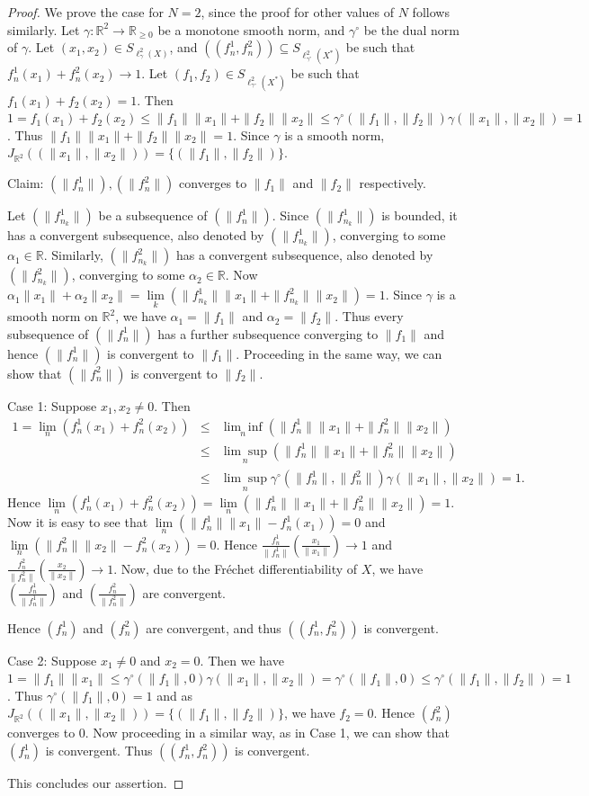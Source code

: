 \documentclass[11pt]{amsart}
\newcommand{\ra}{\rightarrow}
\newcommand{\ci}{\subseteq}
\newcommand{\al}{\alpha}
\newcommand{\ga}{\gamma}
\newcommand{\mb}{\mathbb}
\newcommand{\cc}{\circ}
\newcommand{\beqa}{\begin{eqnarray*}}
\newcommand{\eeqa}{\end{eqnarray*}}
\begin{document}
\begin{proof}
We prove the case for $N=2$, since the proof for other values of $N$ follows similarly. Let $\ga:\mb{R}^2\ra\mb{R}_{\geq0}$ be a monotone smooth norm, and $\ga^\cc$ be the dual norm of $\ga$. Let $(x_1,x_2)\in S_{\ell_\ga^2(X)}$,  and $((f_n^1,f_n^2))\ci S_{\ell_{\ga^\cc}^2(X^*)}$ be such that $f_n^1(x_1)+f_n^2(x_2)\ra 1$. Let $(f_1,f_2)\in S_{\ell_{\ga^\cc}^2(X^*)}$ be such that $f_1(x_1)+f_2(x_2)=1$. Then $1=f_1(x_1)+f_2(x_2)\leq\|f_1\|\|x_1\|+\|f_2\|\|x_2\|\leq\ga^\cc(\|f_1\|,\|f_2\|)\ga(\|x_1\|,\|x_2\|)=1$. Thus $\|f_1\|\|x_1\|+\|f_2\|\|x_2\|=1$. Since $\ga$ is a smooth norm, $J_{\mb{R}^2}((\|x_1\|,\|x_2\|))=\{(\|f_1\|,\|f_2\|)\}$.

{\sc Claim:} $(\|f_n^1\|),(\|f_n^2\|)$ converges to $\|f_1\|$ and $\|f_2\|$ respectively.

Let $(\|f_{n_k}^1\|)$ be a subsequence of $(\|f_n^1\|)$. Since $(\|f_{n_k}^1\|)$ is bounded, it has a convergent subsequence, also denoted by $(\|f_{n_k}^1\|)$, converging to some $\al_1\in\mb{R}$. Similarly, $(\|f_{n_k}^2\|)$ has a convergent subsequence, also denoted by $(\|f_{n_k}^2\|)$, converging to some $\al_2\in\mb{R}$. Now $\al_1\|x_1\|+\al_2\|x_2\|=\underset{k}{\lim}(\|f_{n_k}^1\|\|x_1\|+\|f_{n_k}^2\|\|x_2\|)=1$. Since $\ga$ is a smooth norm on $\mb{R}^2$, we have $\al_1=\|f_1\|$ and $\al_2=\|f_2\|$.  Thus every subsequence of $(\|f_n^1\|)$ has a further subsequence converging to $\|f_1\|$ and hence $(\|f_n^1\|)$ is convergent to $\|f_1\|$. Proceeding in the same way, we can show that $(\|f_n^2\|)$ is convergent to $\|f_2\|$.

{\sc Case 1: } Suppose $x_1,x_2\neq0$. Then
\beqa
1=\underset{n}{\lim}(f_n^1(x_1)+f_n^2(x_2))&\leq&\underset{n}{\lim\inf}(\|f_n^1\|\|x_1\|+\|f_n^2\|\|x_2\|)\\
&\leq&\underset{n}{\lim\sup}(\|f_n^1\|\|x_1\|+\|f_n^2\|\|x_2\|)\\
&\leq&\underset{n}{\lim\sup}\ga^\cc(\|f_n^1\|,\|f_n^2\|)\ga(\|x_1\|,\|x_2\|)=1.
\eeqa
Hence $\underset{n}{\lim}(f_n^1(x_1)+f_n^2(x_2))=\underset{n}{\lim}(\|f_n^1\|\|x_1\|+\|f_n^2\|\|x_2\|)=1$.  Now it is easy to see that $\underset{n}{\lim}(\|f_n^1\|\|x_1\|-f_n^1(x_1))=0$ and  $\underset{n}{\lim}(\|f_n^2\|\|x_2\|-f_n^2(x_2))=0$. Hence $\frac{f_n^1}{\|f_n^1\|}(\frac{x_1}{\|x_1\|})\ra 1$ and $\frac{f_n^2}{\|f_n^2\|}(\frac{x_2}{\|x_2\|})\ra 1$. Now, due to the Fr\'echet differentiability of $X$, we have $(\frac{f_n^1}{\|f_n^1\|})$ and $(\frac{f_n^2}{\|f_n^2\|})$ are convergent.

 Hence $(f_n^1)$ and $(f_n^2)$ are convergent, and thus $((f_n^1,f_n^2))$ is convergent. 

 {\sc Case 2: } Suppose $x_1\neq0$ and $x_2=0$. Then we have $1=\|f_1\|\|x_1\|\leq\ga^\cc(\|f_1\|,0)\ga(\|x_1\|,\|x_2\|)=\ga^\cc(\|f_1\|,0)\leq\ga^\cc(\|f_1\|,\|f_2\|)=1$. Thus $\ga^\cc(\|f_1\|,0)=1$ and as $J_{\mb{R}^2}((\|x_1\|,\|x_2\|))=\{(\|f_1\|,\|f_2\|)\}$, we have $f_2=0$. Hence $(f_n^2)$ converges to 0. Now proceeding in a similar way, as in Case 1, we can show that $(f_n^1)$ is convergent. Thus $((f_n^1,f_n^2))$ is convergent. 

 This concludes our assertion.
\end{proof}
\end{document}
